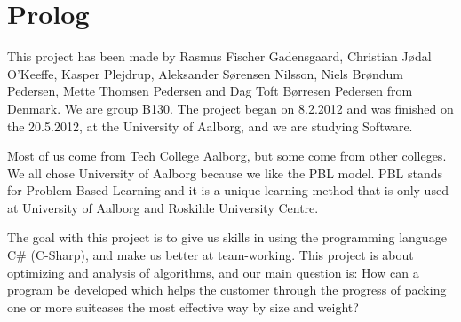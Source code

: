 \chapter{Prolog}

This project has been made by Rasmus Fischer Gadensgaard, Christian Jødal O’Keeffe, Kasper Plejdrup, Aleksander Sørensen Nilsson, Niels Brøndum Pedersen, Mette Thomsen
Pedersen and Dag Toft Børresen Pedersen from Denmark. We are group B130. The project began on 8.2.2012 and was finished on the 20.5.2012, at the University of
Aalborg, and we are studying Software.

Most of us come from Tech College Aalborg, but some come from other colleges. We all chose University of Aalborg because we like the PBL model. PBL stands for Problem
Based Learning and it is a unique learning method that is only used at University of Aalborg and Roskilde University Centre.

The goal with this project is to give us skills in using the programming language C# (C-Sharp), and make us better at team-working. This project is about optimizing and analysis of algorithms, and our main question is: How can a program be developed which helps the customer through the progress of packing one or more suitcases the most effective way by size and weight?
